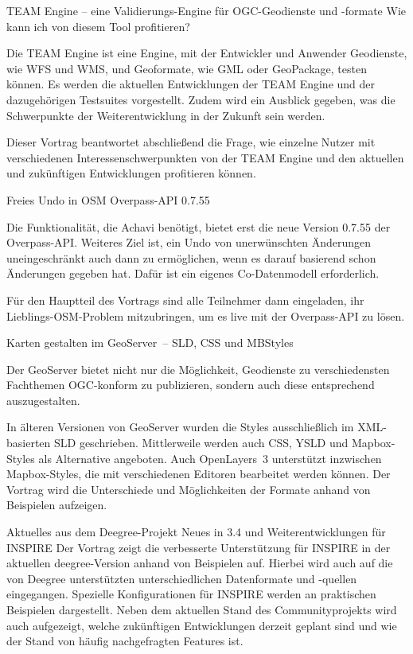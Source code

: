 %
{TEAM Engine -- eine Validierungs-Engine für OGC-Geodienste und -formate}%
{Wie kann ich von diesem Tool profitieren?}%
{%
Die TEAM Engine ist eine Engine, mit der Entwickler und Anwender Geodienste,
wie WFS und WMS, und Geoformate, wie GML oder GeoPackage, testen können.  Es
werden die aktuellen Entwicklungen der TEAM Engine und der dazugehörigen
Testsuites vorgestellt. Zudem wird ein Ausblick gegeben, was die Schwerpunkte
der Weiterentwicklung in der Zukunft sein werden.

Dieser Vortrag beantwortet abschließend die Frage, wie einzelne Nutzer mit
verschiedenen Interessenschwerpunkten von der TEAM Engine und den aktuellen und
zukünftigen Entwicklungen profitieren können.%
}

%
{Freies Undo in OSM}%
{Overpass-API 0.7.55}%
{%
Die Funktionalität, die Achavi benötigt, bietet erst die neue Version 0.7.55
der Overpass-API. Weiteres Ziel ist, ein Undo von unerwünschten Änderungen
uneingeschränkt auch dann zu ermöglichen, wenn es darauf basierend schon
Änderungen gegeben hat. Dafür ist ein eigenes Co-Datenmodell erforderlich.

Für den Hauptteil des Vortrags sind alle Teilnehmer dann eingeladen, ihr
Lieblings-OSM-Problem mitzubringen, um es live mit der Overpass-API zu lösen.%
}

%
{Karten gestalten im GeoServer~-- SLD, CSS und MBStyles}%
{}%
{%
Der GeoServer bietet nicht nur die Möglichkeit, Geodienste zu verschiedensten
Fachthemen OGC-konform zu publizieren, sondern auch diese entsprechend
auszugestalten.

In älteren Versionen von GeoServer wurden die Styles ausschließlich im
XML-basierten SLD geschrieben. Mittlerweile werden auch CSS, YSLD und
Mapbox-Styles als Alternative angeboten.  Auch OpenLayers~3 unterstützt
inzwischen Mapbox-Styles, die mit verschiedenen Editoren bearbeitet werden
können. Der Vortrag wird die Unterschiede und Möglichkeiten der Formate anhand
von Beispielen aufzeigen.%
}

%
{Aktuelles aus dem Deegree-Projekt}%
{Neues in 3.4 und Weiterentwicklungen für INSPIRE}%
{%
Der Vortrag zeigt die verbesserte Unterstützung für INSPIRE in der aktuellen
deegree-Version anhand von Beispielen auf. Hierbei wird auch auf die von
Deegree unterstützten unterschiedlichen Datenformate und -quellen eingegangen.
Spezielle Konfigurationen für INSPIRE werden an praktischen Beispielen
dargestellt. Neben dem aktuellen Stand des Communityprojekts wird auch
aufgezeigt, welche zukünftigen Entwicklungen derzeit geplant sind und wie der
Stand von häufig nachgefragten Features ist.%
}


